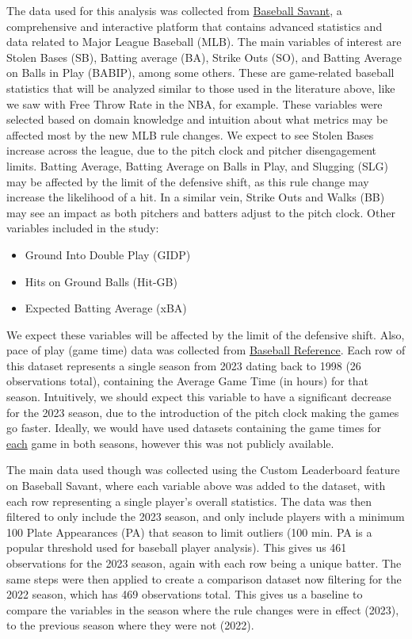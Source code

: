\documentclass[12pt]{article}
\begin{document}
The data used for this analysis was collected from \href{https://baseballsavant.mlb.com/}{Baseball Savant},
a comprehensive and interactive platform that contains advanced statistics and
data related to Major League Baseball (MLB). The main variables of interest
are Stolen Bases (SB), Batting average (BA), Strike Outs (SO), and Batting
Average on Balls in Play (BABIP), among some others. These are game-related
baseball statistics that will be analyzed similar to those used in the literature
above, like we saw with Free Throw Rate in the NBA, for example. These variables
were selected based on domain knowledge and intuition about what metrics may be
affected most by the new MLB rule changes. We expect to see Stolen Bases increase
across the league, due to the pitch clock and pitcher disengagement limits. Batting
Average, Batting Average on Balls in Play, and Slugging (SLG) may be affected by
the limit of the defensive shift, as this rule change may increase the likelihood
of a hit. In a similar vein, Strike Outs and Walks (BB) may see an impact as both
pitchers and batters adjust to the pitch clock. Other variables included in the
study:
\begin{itemize}
  \item Ground Into Double Play (GIDP)
  \item Hits on Ground Balls (Hit-GB)
  \item Expected Batting Average (xBA)
\end{itemize}
We expect these variables will be affected by the limit of the defensive shift.
Also, pace of play (game time) data was collected from \href{https://www.baseball-reference.com/}{Baseball Reference}.
Each row of this dataset represents a single season from 2023 dating back to 1998
(26 observations total), containing the Average Game Time (in hours) for that season.
Intuitively, we should expect this variable to have a significant decrease for the
2023 season, due to the introduction of the pitch clock making the games go faster.
Ideally, we would have used datasets containing the game times for \underline{each}
game in both seasons, however this was not publicly available.

The main data used though was collected using the Custom Leaderboard feature
on Baseball Savant, where each variable above was added to the dataset, with each
row representing a single player's overall statistics. The data was then filtered
to only include the 2023 season, and only include players with a minimum 100 Plate Appearances (PA)
that season to limit outliers (100 min. PA is a popular threshold used for 
baseball player analysis). This gives us 461 observations for the 2023 season,
again with each row being a unique batter. The same steps were then applied to
create a comparison dataset now filtering for the 2022 season, which has 469
observations total. This gives us a baseline to compare the variables in the
season where the rule changes were in effect (2023), to the previous season where
they were not (2022).
\end{document}
